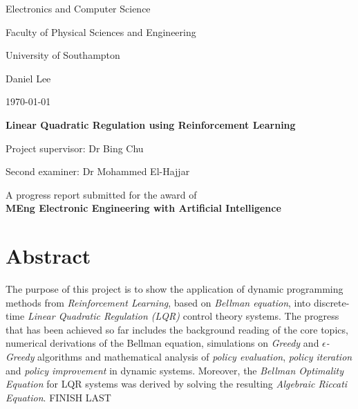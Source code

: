 \documentclass[a4paper]{article}
\begin{document}
	
	\begin{titlepage}
		\vspace*{\fill}
		\begin{center}
		\centering
		{\Huge Electronics and Computer Science \par}
		{\Huge Faculty of Physical Sciences and Engineering \par}
		{\Huge University of Southampton \par}
		\hfill \break
		{\Large Daniel Lee \par}
		{\Large \today \par}
		\hfill \break
		{\huge\bfseries Linear Quadratic Regulation using Reinforcement Learning \par}
		\hfill \break
		{\Large Project supervisor: Dr Bing Chu \par}
		{\Large Second examiner: Dr Mohammed El-Hajjar \par}
		\hfill \break
		{\large A progress report submitted for the award of \\
			\bfseries MEng Electronic Engineering with Artificial Intelligence \par}
		\end{center}
		\vspace*{\fill}
	\end{titlepage}
	\pagebreak
	\setcounter{page}{2}
	
	\section*{Abstract}
	The purpose of this project is to show the application of dynamic programming methods from \textit{Reinforcement Learning}, based on \textit{Bellman equation}, into discrete-time \textit{Linear Quadratic Regulation (LQR)} control theory systems. The progress that has been achieved so far includes the background reading of the core topics, numerical derivations of the Bellman equation, simulations on \textit{Greedy} and \textit{$\epsilon$-Greedy} algorithms and mathematical analysis of \textit{policy evaluation}, \textit{policy iteration} and \textit{policy improvement} in dynamic systems. Moreover, the \textit{Bellman Optimality Equation} for LQR systems was derived by solving the resulting \textit{Algebraic Riccati Equation}. FINISH LAST
	
	\pagebreak
	
	\tableofcontents
	
	\pagebreak
	
\end{document}

